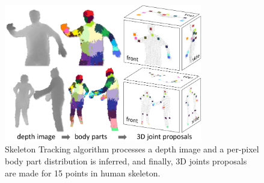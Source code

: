 \begin{figure}
	[h] \centering 
	\includegraphics[height=6cm]{figures/content/ni-alg.jpg} \caption{Skeleton Tracking algorithm processes a depth image and a per-pixel body part distribution is inferred, and finally, 3D joints proposals are made for 15 points in human skeleton. \cite{13} } \label{fg:ni:alg} 
\end{figure}
